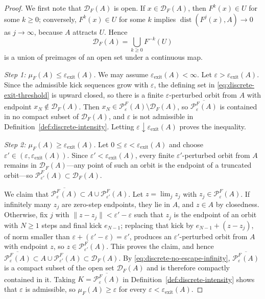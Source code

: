 \documentclass[pdflatex,sn-mathphys-num]{sn-jnl}
\numberwithin{equation}{section}
\theoremstyle{thmstyleone}%
\theoremstyle{definition}
\theoremstyle{remark}
\begin{document}
\begin{proof}
We first note that $\mathcal D_F(A)$ is open. If $x\in\mathcal D_F(A)$, then $F^k(x)\in U$ for some $k\geq0$; conversely, $F^k(x)\in U$ for some $k$ implies $\operatorname{dist}(F^j(x),A)\to0$ as $j\to\infty$, because $A$ attracts $U$. Hence
\[
    \mathcal D_F(A)
    =
    \bigcup_{k\geq0}F^{-k}(U)
\]
is a union of preimages of an open set under a continuous map.

\emph{Step 1: $\mu_F(A)\leq\varepsilon_{\mathrm{exit}}(A)$.}
We may assume $\varepsilon_{\mathrm{exit}}(A)<\infty$. Let $\varepsilon>\varepsilon_{\mathrm{exit}}(A)$. Since the admissible kick sequences grow with $\varepsilon$, the defining set in \eqref{eq:discrete-exit-threshold} is upward closed, so there is a finite $\varepsilon$-perturbed orbit from $A$ with endpoint $x_N\notin\mathcal D_F(A)$. Then $x_N\in\mathcal P_\varepsilon^F(A)\setminus\mathcal D_F(A)$, so $\overline{\mathcal P_\varepsilon^F(A)}$ is contained in no compact subset of $\mathcal D_F(A)$, and $\varepsilon$ is not admissible in Definition~\ref{def:discrete-intensity}. Letting $\varepsilon\downarrow\varepsilon_{\mathrm{exit}}(A)$ proves the inequality.

\emph{Step 2: $\mu_F(A)\geq\varepsilon_{\mathrm{exit}}(A)$.}
Let $0\leq\varepsilon<\varepsilon_{\mathrm{exit}}(A)$ and choose $\varepsilon'\in(\varepsilon,\varepsilon_{\mathrm{exit}}(A))$. Since $\varepsilon'<\varepsilon_{\mathrm{exit}}(A)$, every finite $\varepsilon'$-perturbed orbit from $A$ remains in $\mathcal D_F(A)$---any point of such an orbit is the endpoint of a truncated orbit---so $\mathcal P_{\varepsilon'}^F(A)\subset\mathcal D_F(A)$.

We claim that
$\overline{\mathcal P_\varepsilon^F(A)}
    \subset
    A\cup\mathcal P_{\varepsilon'}^F(A)$.
Let $z=\lim_j z_j$ with $z_j\in\mathcal P_\varepsilon^F(A)$. If infinitely many $z_j$ are zero-step endpoints, they lie in $A$, and $z\in A$ by closedness. Otherwise, fix $j$ with $\|z-z_j\|<\varepsilon'-\varepsilon$ such that $z_j$ is the endpoint of an orbit with $N\geq1$ steps and final kick $e_{N-1}$; replacing that kick by $e_{N-1}+(z-z_j)$, of norm smaller than $\varepsilon+(\varepsilon'-\varepsilon)=\varepsilon'$, produces an $\varepsilon'$-perturbed orbit from $A$ with endpoint $z$, so $z\in\mathcal P_{\varepsilon'}^F(A)$. This proves the claim, and hence   
$\overline{\mathcal P_\varepsilon^F(A)}
    \subset
    A\cup\mathcal P_{\varepsilon'}^F(A)
    \subset
    \mathcal D_F(A)$.
By \eqref{eq:discrete-no-escape-infinity}, $\overline{\mathcal P_\varepsilon^F(A)}$ is a compact subset of the open set $\mathcal D_F(A)$ and is therefore compactly contained in it. Taking $K=\overline{\mathcal P_\varepsilon^F(A)}$ in Definition~\ref{def:discrete-intensity} shows that $\varepsilon$ is admissible, so $\mu_F(A)\geq\varepsilon$ for every $\varepsilon<\varepsilon_{\mathrm{exit}}(A)$. 
\end{proof}
\end{document}
